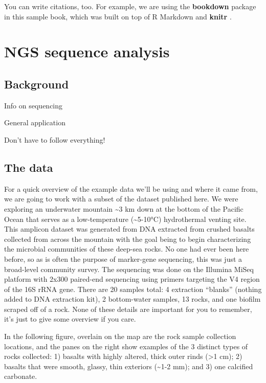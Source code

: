 \documentclass[
]{book}
\begin{document}
You can write citations, too. For example, we are using the \textbf{bookdown} package \citep{R-bookdown} in this sample book, which was built on top of R Markdown and \textbf{knitr} \citep{xie2015}.

\hypertarget{ngs-sequence-analysis}{%
\chapter{NGS sequence analysis}\label{ngs-sequence-analysis}}

\hypertarget{background}{%
\section{Background}\label{background}}

Info on sequencing

General application

Don't have to follow everything!

\hypertarget{the-data}{%
\section{The data}\label{the-data}}

For a quick overview of the example data we'll be using and where it came from, we are going to work with a subset of the dataset published here. We were exploring an underwater mountain \textasciitilde3 km down at the bottom of the Pacific Ocean that serves as a low-temperature (\textasciitilde5-10°C) hydrothermal venting site. This amplicon dataset was generated from DNA extracted from crushed basalts collected from across the mountain with the goal being to begin characterizing the microbial communities of these deep-sea rocks. No one had ever been here before, so as is often the purpose of marker-gene sequencing, this was just a broad-level community survey. The sequencing was done on the Illumina MiSeq platform with 2x300 paired-end sequencing using primers targeting the V4 region of the 16S rRNA gene. There are 20 samples total: 4 extraction ``blanks'' (nothing added to DNA extraction kit), 2 bottom-water samples, 13 rocks, and one biofilm scraped off of a rock. None of these details are important for you to remember, it's just to give some overview if you care.

In the following figure, overlain on the map are the rock sample collection locations, and the panes on the right show examples of the 3 distinct types of rocks collected: 1) basalts with highly altered, thick outer rinds (\textgreater1 cm); 2) basalts that were smooth, glassy, thin exteriors (\textasciitilde1-2 mm); and 3) one calcified carbonate.
\end{document}
